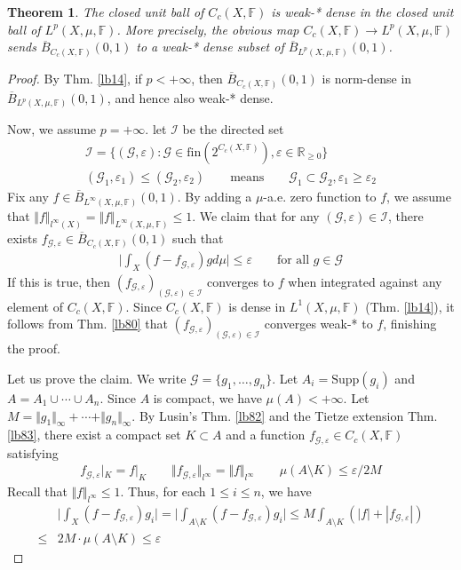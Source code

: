 \documentclass[12pt,b5paper,notitlepage]{article}
\theoremstyle{definition}
\theoremstyle{plain}
\newtheorem{thm}[df]{Theorem}
\newcommand{\ovl}{\overline}
\newcommand{\scr}{\mathscr}
\newcommand{\Rbb}{\mathbb R}
\newcommand{\fin}{\mathrm{fin}}
\newcommand{\Supp}{\mathrm{Supp}}
\newcommand{\Fbb}{\mathbb F}
\newcommand{\eps}{\varepsilon}
\newcommand{\MG}{\mathcal G}
\numberwithin{equation}{section}
\begin{document}
\begin{thm}\label{lb86}
The closed unit ball of $C_c(X,\Fbb)$ is weak-* dense in the closed unit ball of $L^p(X,\mu,\Fbb)$. More precisely, the obvious map $C_c(X,\Fbb)\rightarrow L^p(X,\mu,\Fbb)$ sends $\ovl B_{C_c(X,\Fbb)}(0,1)$ to a weak-* dense subset of $\ovl B_{L^p(X,\mu,\Fbb)}(0,1)$.
\end{thm}


\begin{proof}
By Thm. \ref{lb14}, if $p<+\infty$, then $\ovl B_{C_c(X,\Fbb)}(0,1)$ is norm-dense in $\ovl B_{L^p(X,\mu,\Fbb)}(0,1)$, and hence also weak-* dense.

Now, we assume $p=+\infty$. let $\scr I$ be the directed set
\begin{gather*}
\scr I=\{(\MG,\eps):\MG\in\fin(2^{C_c(X,\Fbb)}),\eps\in\Rbb_{\geq0}\}\\
(\MG_1,\eps_1)\leq(\MG_2,\eps_2)\qquad\text{means}\qquad \MG_1\subset\MG_2,\eps_1\geq\eps_2
\end{gather*}
Fix any $f\in \ovl B_{L^\infty(X,\mu,\Fbb)}(0,1)$. By adding a $\mu$-a.e. zero function to $f$, we assume that $\Vert f\Vert_{l^\infty(X)}=\Vert f\Vert_{L^\infty(X,\mu,\Fbb)}\leq 1$. We claim that for any $(\MG,\eps)\in\scr I$, there exists $f_{\MG,\eps}\in \ovl B_{C_c(X,\Fbb)}(0,1)$ such that
\begin{align*}
\Big| \int_X (f-f_{\MG,\eps})gd\mu\Big|\leq\eps\qquad\text{for all }g\in\MG
\end{align*}
If this is true, then $(f_{\MG,\eps})_{(\MG,\eps)\in\scr I}$ converges to $f$ when integrated against any element of $C_c(X,\Fbb)$. Since $C_c(X,\Fbb)$ is dense in $L^1(X,\mu,\Fbb)$ (Thm. \ref{lb14}), it follows from Thm. \ref{lb80} that $(f_{\MG,\eps})_{(\MG,\eps)\in\scr I}$ converges weak-* to $f$, finishing the proof.

Let us prove the claim. We write $\MG=\{g_1,\dots,g_n\}$. Let $A_i=\Supp(g_i)$ and $A=A_1\cup\cdots\cup A_n$. Since $A$ is compact, we have $\mu(A)<+\infty$. Let $M=\Vert g_1\Vert_\infty+\cdots+\Vert g_n\Vert_\infty$. By Lusin's Thm. \ref{lb82} and the Tietze extension Thm. \ref{lb83}, there exist a compact set $K\subset A$ and a function $f_{\MG,\eps}\in C_c(X,\Fbb)$ satisfying
\begin{align*}
f_{\MG,\eps}|_K=f|_K\qquad\Vert f_{\MG,\eps}\Vert_{l^\infty}=\Vert f\Vert_{l^\infty}\qquad \mu(A\setminus K)\leq\eps/2M
\end{align*}
Recall that $\Vert f\Vert_{l^\infty}\leq 1$. Thus, for each $1\leq i\leq n$, we have
\begin{align*}
&\Big| \int_X (f-f_{\MG,\eps})g_i\Big|=\Big| \int_{A\setminus K} (f-f_{\MG,\eps})g_i\Big|\leq M\int_{A\setminus K}(|f|+|f_{\MG,\eps}|)\\
\leq&2M\cdot \mu(A\setminus K)\leq \eps
\end{align*}
\end{proof}
\end{document}

